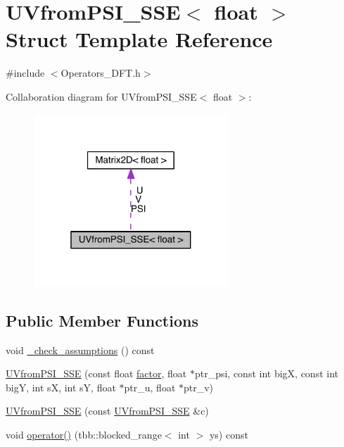 \hypertarget{struct_u_vfrom_p_s_i___s_s_e_3_01float_01_4}{}\section{U\+Vfrom\+P\+S\+I\+\_\+\+S\+S\+E$<$ float $>$ Struct Template Reference}
\label{struct_u_vfrom_p_s_i___s_s_e_3_01float_01_4}


{\ttfamily \#include $<$Operators\+\_\+\+D\+F\+T.\+h$>$}



Collaboration diagram for U\+Vfrom\+P\+S\+I\+\_\+\+S\+S\+E$<$ float $>$\+:\nopagebreak
\begin{figure}[H]
\begin{center}
\leavevmode
\includegraphics[width=208pt]{d9/d8a/struct_u_vfrom_p_s_i___s_s_e_3_01float_01_4__coll__graph}
\end{center}
\end{figure}
\subsection*{Public Member Functions}
\begin{DoxyCompactItemize}
\item 
void \hyperlink{struct_u_vfrom_p_s_i___s_s_e_3_01float_01_4_a881d64138872b749a022d15096b16f35}{\+\_\+check\+\_\+assumptions} () const 
\item 
\hyperlink{struct_u_vfrom_p_s_i___s_s_e_3_01float_01_4_ae8cbc637b76f83a4e5ed40a20a9f7576}{U\+Vfrom\+P\+S\+I\+\_\+\+S\+S\+E} (const float \hyperlink{struct_u_vfrom_p_s_i___s_s_e_3_01float_01_4_a0cdc869087c869067277eae491256240}{factor}, float $\ast$ptr\+\_\+psi, const int big\+X, const int big\+Y, int s\+X, int s\+Y, float $\ast$ptr\+\_\+u, float $\ast$ptr\+\_\+v)
\item 
\hyperlink{struct_u_vfrom_p_s_i___s_s_e_3_01float_01_4_a627413c6971bd69a9a4174700071940a}{U\+Vfrom\+P\+S\+I\+\_\+\+S\+S\+E} (const \hyperlink{struct_u_vfrom_p_s_i___s_s_e}{U\+Vfrom\+P\+S\+I\+\_\+\+S\+S\+E} \&c)
\item 
void \hyperlink{struct_u_vfrom_p_s_i___s_s_e_3_01float_01_4_aff805046b744c5b622b8a241e1dac4a3}{operator()} (tbb\+::blocked\+\_\+range$<$ int $>$ ys) const 
\end{DoxyCompactItemize}
